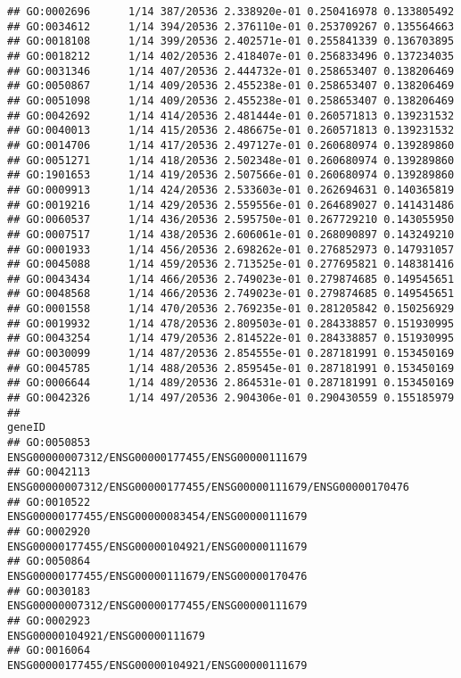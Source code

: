 \documentclass[
]{article}
\begin{document}
\begin{verbatim}
## GO:0002696      1/14 387/20536 2.338920e-01 0.250416978 0.133805492
## GO:0034612      1/14 394/20536 2.376110e-01 0.253709267 0.135564663
## GO:0018108      1/14 399/20536 2.402571e-01 0.255841339 0.136703895
## GO:0018212      1/14 402/20536 2.418407e-01 0.256833496 0.137234035
## GO:0031346      1/14 407/20536 2.444732e-01 0.258653407 0.138206469
## GO:0050867      1/14 409/20536 2.455238e-01 0.258653407 0.138206469
## GO:0051098      1/14 409/20536 2.455238e-01 0.258653407 0.138206469
## GO:0042692      1/14 414/20536 2.481444e-01 0.260571813 0.139231532
## GO:0040013      1/14 415/20536 2.486675e-01 0.260571813 0.139231532
## GO:0014706      1/14 417/20536 2.497127e-01 0.260680974 0.139289860
## GO:0051271      1/14 418/20536 2.502348e-01 0.260680974 0.139289860
## GO:1901653      1/14 419/20536 2.507566e-01 0.260680974 0.139289860
## GO:0009913      1/14 424/20536 2.533603e-01 0.262694631 0.140365819
## GO:0019216      1/14 429/20536 2.559556e-01 0.264689027 0.141431486
## GO:0060537      1/14 436/20536 2.595750e-01 0.267729210 0.143055950
## GO:0007517      1/14 438/20536 2.606061e-01 0.268090897 0.143249210
## GO:0001933      1/14 456/20536 2.698262e-01 0.276852973 0.147931057
## GO:0045088      1/14 459/20536 2.713525e-01 0.277695821 0.148381416
## GO:0043434      1/14 466/20536 2.749023e-01 0.279874685 0.149545651
## GO:0048568      1/14 466/20536 2.749023e-01 0.279874685 0.149545651
## GO:0001558      1/14 470/20536 2.769235e-01 0.281205842 0.150256929
## GO:0019932      1/14 478/20536 2.809503e-01 0.284338857 0.151930995
## GO:0043254      1/14 479/20536 2.814522e-01 0.284338857 0.151930995
## GO:0030099      1/14 487/20536 2.854555e-01 0.287181991 0.153450169
## GO:0045785      1/14 488/20536 2.859545e-01 0.287181991 0.153450169
## GO:0006644      1/14 489/20536 2.864531e-01 0.287181991 0.153450169
## GO:0042326      1/14 497/20536 2.904306e-01 0.290430559 0.155185979
##                                                                     geneID
## GO:0050853                 ENSG00000007312/ENSG00000177455/ENSG00000111679
## GO:0042113 ENSG00000007312/ENSG00000177455/ENSG00000111679/ENSG00000170476
## GO:0010522                 ENSG00000177455/ENSG00000083454/ENSG00000111679
## GO:0002920                 ENSG00000177455/ENSG00000104921/ENSG00000111679
## GO:0050864                 ENSG00000177455/ENSG00000111679/ENSG00000170476
## GO:0030183                 ENSG00000007312/ENSG00000177455/ENSG00000111679
## GO:0002923                                 ENSG00000104921/ENSG00000111679
## GO:0016064                 ENSG00000177455/ENSG00000104921/ENSG00000111679

\end{verbatim}
\end{document}
